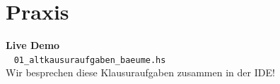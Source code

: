 \documentclass[aspectratio=169,11pt]{beamer}
\begin{document}
\section{Praxis}

\begin{frame}[plain]
    \begin{center}
        \Huge \textbf{Live Demo} \\
        \vspace{0.5cm}
        \large \faLaptopCode~ \texttt{01\_altkausuraufgaben\_baeume.hs} \\
        \vspace{0.3cm}
        \normalsize Wir besprechen diese Klausuraufgaben zusammen in der IDE!
    \end{center}
\end{frame}
\end{document}
